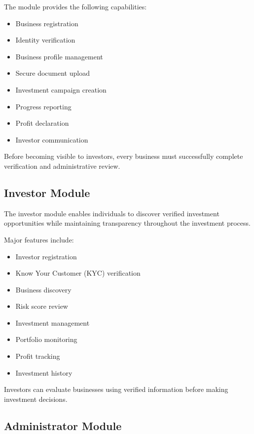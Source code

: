 The module provides the following capabilities:

\begin{itemize}
\item Business registration
\item Identity verification
\item Business profile management
\item Secure document upload
\item Investment campaign creation
\item Progress reporting
\item Profit declaration
\item Investor communication
\end{itemize}

Before becoming visible to investors, every business must successfully complete verification and administrative review.


\subsection{Investor Module}

The investor module enables individuals to discover verified investment opportunities while maintaining transparency throughout the investment process.

Major features include:

\begin{itemize}
\item Investor registration
\item Know Your Customer (KYC) verification
\item Business discovery
\item Risk score review
\item Investment management
\item Portfolio monitoring
\item Profit tracking
\item Investment history
\end{itemize}

Investors can evaluate businesses using verified information before making investment decisions.


\subsection{Administrator Module}

